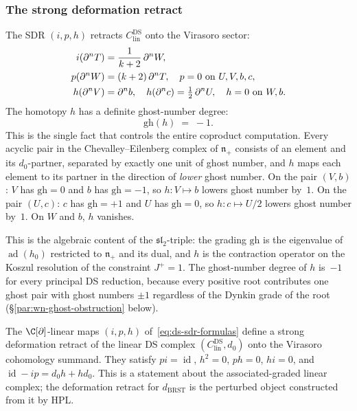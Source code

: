 \subsubsection*{The strong deformation retract}

The SDR $(i, p, h)$ retracts \(C^{\mathrm{DS}}_{\mathrm{lin}}\) onto the
Virasoro sector:
\begin{align}\label{eq:ds-sdr-formulas}
i(\partial^n T) &= \frac{1}{k+2}\,\partial^n W, \notag\\
p(\partial^n W) &= (k+2)\,\partial^n T,
\quad p = 0 \text{ on } U, V, b, c, \\
h(\partial^n V) &= \partial^n b,
\quad h(\partial^n c) = \tfrac{1}{2}\,\partial^n U,
\quad h = 0 \text{ on } W, b. \notag
\end{align}
The homotopy $h$ has a definite ghost-number degree:
\begin{equation}\label{eq:homotopy-ghost-degree}
\boxed{\;\mathrm{gh}(h) \;=\; -1.\;}
\end{equation}
This is the single fact that controls the entire coproduct
computation. Every acyclic pair in the
Chevalley--Eilenberg complex of $\mathfrak{n}_+$ consists of an
element and its $d_0$-partner, separated by exactly one unit of
ghost number, and $h$ maps each element to its partner in
the direction of \emph{lower} ghost number. On the pair
$(V, b)$: $V$ has $\mathrm{gh} = 0$ and $b$ has
$\mathrm{gh} = -1$, so $h\colon V \mapsto b$ lowers ghost
number by~$1$. On the pair $(U, c)$: $c$ has
$\mathrm{gh} = +1$ and $U$ has $\mathrm{gh} = 0$, so
$h\colon c \mapsto U/2$ lowers ghost number by~$1$. On $W$ and
$b$, $h$ vanishes.

This is the algebraic content of the
$\mathfrak{sl}_2$-triple: the grading $\mathrm{gh}$ is the
eigenvalue of $\operatorname{ad}(h_0)$ restricted to
$\mathfrak{n}_+$ and its dual, and $h$ is the contraction
operator on the Koszul resolution of the constraint
$J^+ = 1$. The ghost-number degree of $h$ is~$-1$ for
every principal DS reduction, because every positive root
contributes one ghost pair with ghost numbers $\pm 1$
regardless of the Dynkin grade of the root
(\S\ref{par:wn-ghost-obstruction} below).

\begin{proposition}\label{prop:ds-sdr}
The \(\C[\partial]\)-linear maps $(i, p, h)$
of~\eqref{eq:ds-sdr-formulas} define a strong deformation retract
of the linear DS complex
\((C^{\mathrm{DS}}_{\mathrm{lin}},d_0)\) onto the Virasoro
cohomology summand.  They satisfy
$pi = \operatorname{id}$, $h^2 = 0$, $ph = 0$, $hi = 0$,
and $\operatorname{id} - ip = d_0 h + h d_0$.
This is a statement about the associated-graded linear complex; the
deformation retract for \(d_{\mathrm{BRST}}\) is the perturbed object
constructed from it by HPL.
\end{proposition}

